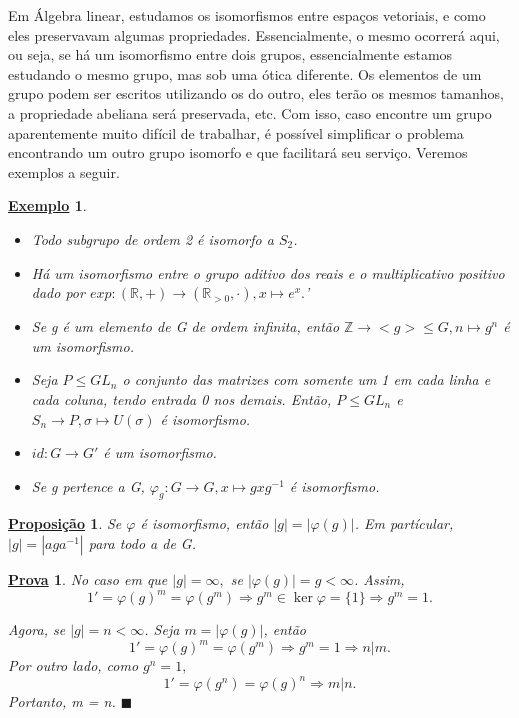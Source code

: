 \documentclass{article}
\newtheorem*{prop*}{\underline{Proposi\c c\~ao}}
\newtheorem{example*}{\underline{Exemplo}}
\newtheorem*{proof*}{\underline{Prova}}
\renewcommand\qedsymbol{$\blacksquare$}
\begin{document}
  Em \'Algebra linear, estudamos os isomorfismos entre espa\c cos vetoriais, e como eles preservavam algumas propriedades. Essencialmente,
o mesmo ocorrer\'a aqui, ou seja, se h\'a um isomorfismo entre dois grupos, essencialmente estamos estudando o mesmo grupo, mas sob uma \'otica diferente.
Os elementos de um grupo podem ser escritos utilizando os do outro, eles ter\~ao os mesmos tamanhos, a propriedade abeliana ser\'a preservada, etc.
Com isso, caso encontre um grupo aparentemente muito dif\'icil de trabalhar, \'e poss\'ivel simplificar o problema encontrando um outro grupo
isomorfo e que facilitar\'a seu servi\c co. Veremos exemplos a seguir.
 \begin{example*}
  \begin{itemize}
    \item[1)] Todo subgrupo de ordem 2 \'e isomorfo a $S_{2}$.
    \item[2)] H\'a um isomorfismo entre o grupo aditivo dos reais e o multiplicativo positivo dado por $exp:(\mathbb{R}, +)\rightarrow (\mathbb{R}_{>0}, \cdot), x\mapsto e^{x}.$'
    \item[3)] Se g \'e um elemento de G de ordem infinita, ent\~ao $\mathbb{Z}\rightarrow <g>\leq{G}, n\mapsto g^{n}$ \'e um isomorfismo.
    \item[4)] Seja $P\leq{GL_{n}}$ o conjunto das matrizes com somente um 1 em cada linha e cada coluna, tendo entrada 0 nos demais. Ent\~ao,
  $P\leq{GL_{n}}$ e $S_{n}\rightarrow P, \sigma\mapsto U(\sigma)$ \'e isomorfismo.
    \item[5)] $id:G\rightarrow G'$ \'e um isomorfismo.
    \item[6)] Se g pertence a G, $\varphi_{g}:G\rightarrow G, x\mapsto gxg^{-1}$ \'e isomorfismo.
  \end{itemize}
 \end{example*}
 \begin{prop*}
   Se $\varphi$ \'e isomorfismo, ent\~ao $|g| = |\varphi(g)|$. Em part\'icular, $|g| = |aga^{-1}|$ para todo a de G.
 \end{prop*}
\begin{proof*}
    No caso em que $|g| = \infty,$ se $|\varphi(g)| = g < \infty$. Assim, 
      $$
      1' = \varphi(g)^{m} = \varphi(g^{m}) \Rightarrow g^{m}\in\ker{\varphi} = \{1\} \Rightarrow g^{m} = 1.
      $$

    Agora, se $|g| = n <\infty$. Seja $m = |\varphi(g)|$, ent\~ao 
      $$
        1' = \varphi(g)^{m} = \varphi(g^{m}) \Rightarrow g^{m} = 1 \Rightarrow n|m.
      $$ 
    Por outro lado, como $g^{n} = 1,$ 
      $$
        1' = \varphi(g^{n}) = \varphi(g)^{n} \Rightarrow m|n.
      $$
    Portanto, m = n. \qedsymbol
\end{proof*}
\end{document}
